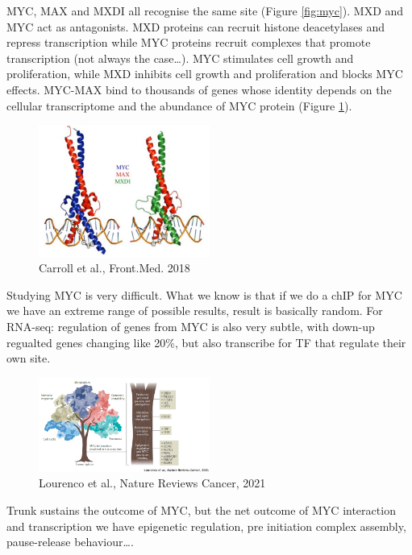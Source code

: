 MYC, MAX and MXDI all recognise the same site (Figure \ref{fig:myc}).
MXD and MYC act as antagonists. MXD proteins can recruit histone deacetylases and repress transcription while MYC proteins recruit complexes that promote transcription (not always the case\ldots). MYC stimulates cell growth and proliferation, while MXD inhibits cell growth and proliferation and blocks MYC effects.
MYC-MAX bind to thousands of genes whose identity depends on the cellular transcriptome and the abundance of MYC protein (Figure \ref{fig:maxmyc}).

\begin{figure}
\centering
\includegraphics[width=0.5\textwidth]{../_resources/017e543a7782177edd93188be60ae382.png}
\caption{Carroll et al., Front.Med. 2018}
\label{fig:maxmyc}
\end{figure}

Studying MYC is very difficult. What we know is that if we do a chIP for MYC we have an extreme range of possible results, result is basically random. For RNA-seq: regulation of genes from MYC is also very subtle, with down-up regualted genes changing like 20\%, but also transcribe for TF that regulate their own site.

\begin{figure}
\centering
\includegraphics[width=0.5\textwidth]{../_resources/e218faf59750ef1a90a9e45629f08973.png}
\caption{Lourenco et al., Nature Reviews Cancer, 2021}
\label{fig:regmyc}
\end{figure}

Trunk sustains the outcome of MYC, but the net outcome of MYC interaction and transcription we have epigenetic regulation, pre initiation complex assembly, pause-release behaviour\ldots. 

